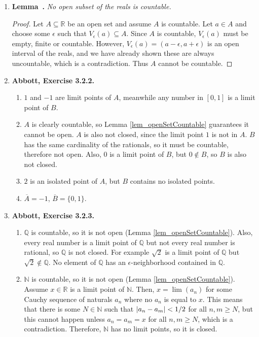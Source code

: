\documentclass{article}
\newcounter{lemmaCounter}
\newenvironment{shortlemma}[1]{\refstepcounter{lemmaCounter}
\label{#1}\textbf{Lemma~\thelemmaCounter.}\em}
\DeclarePairedDelimiter\abs{\lvert}{\rvert}
\newcommand{\N}{\mathbb{N}}
\newcommand{\Q}{\mathbb{Q}}
\newcommand{\R}{\mathbb{R}}
\newcommand{\set}[1]{\{#1\}}
\newcommand{\exc}[2][Abbott]{\item \textbf{#1, Exercise #2.}}
\begin{document}
\begin{enumerate}
    \item \begin{shortlemma}{lem_openSetCountable}
        No open subset of the reals is countable.
    \end{shortlemma}
    
    \begin{proof}
        Let $A \subseteq \R$ be an open set and assume $A$ is countable. Let $a \in A$ and choose some $\epsilon$ such that $V_\epsilon(a) \subseteq A$. Since $A$ is countable, $V_\epsilon(a)$ must be empty, finite or countable. However, $V_\epsilon(a) = (a-\epsilon, a+\epsilon)$ is an open interval of the reals, and we have already shown these are always uncountable, which is a contradiction. Thus $A$ cannot be countable.
    \end{proof}
    
    \exc{3.2.2}
    \begin{enumerate}
        \item $1$ and $-1$ are limit points of $A$, meanwhile any number in $[0, 1]$ is a limit point of $B$.
        
        \item $A$ is clearly countable, so Lemma \ref{lem_openSetCountable} guarantees it cannot be open. $A$ is also not closed, since the limit point $1$ is not in $A$. $B$ has the same cardinality of the rationals, so it must be countable, therefore not open. Also, $0$ is a limit point of $B$, but $0 \notin B$, so $B$ is also not closed.
        
        \item $2$ is an isolated point of $A$, but $B$ contains no isolated points.
        
        \item $\overline{A} = -1$, $\overline{B} = \set{0, 1}$.
    \end{enumerate}
    
    \exc{3.2.3}
    \begin{enumerate}
        \item $\Q$ is countable, so it is not open (Lemma \ref{lem_openSetCountable}). Also, every real number is a limit point of $\Q$ but not every real number is rational, so $\Q$ is not closed. For example $\sqrt{2}$ is a limit point of $\Q$ but $\sqrt{2} \notin \Q$. No element of $\Q$ has an $\epsilon$-neighborhood contained in $\Q$.
        
        \item $\N$ is countable, so it is not open (Lemma \ref{lem_openSetCountable}). Assume $x \in \R$ is a limit point of $\N$. Then, $x = \lim(a_n)$ for some Cauchy sequence of naturals $a_n$ where no $a_n$ is equal to $x$. This means that there is some $N \in \N$ such that $\abs{a_n-a_m} < 1/2$ for all $n,m \geq N$, but this cannot happen unless $a_n = a_m = x$ for all $n,m \geq N$, which is a contradiction. Therefore, $\N$ has no limit points, so it is closed.
        

\end{enumerate}
\end{enumerate}
\end{document}
